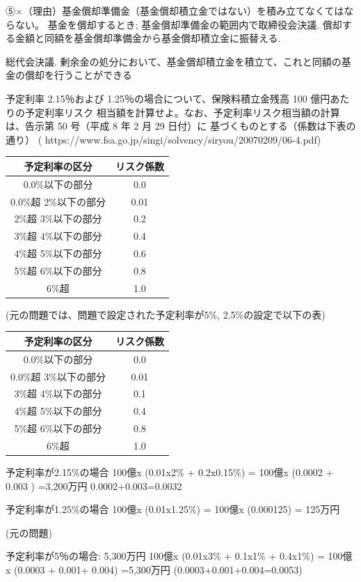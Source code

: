 \documentclass[report,gutter=10mm,fore-edge=10mm,uplatex,dvipdfmx]{jlreq}
\begin{document}
⑤×（理由）基金償却準備金（基金償却積立金ではない）を積み立てなくてはならない。
基金を償却するとき;   
  基金償却準備金の範囲内で取締役会決議.   
  償却する金額と同額を基金償却準備金から基金償却積立金に振替える.

  総代会決議. 剰余金の処分において、基金償却積立金を積立て、これと同額の基金の償却を行うことができる

予定利率 2.15％および 1.25％の場合について、保険料積立金残高 100 億円あたりの予定利率リスク
相当額を計算せよ。なお、予定利率リスク相当額の計算は、告示第 50 号（平成 8 年 2 月 29 日付）に
基づくものとする（係数は下表の通り）
( https://www.fsa.go.jp/singi/solvency/siryou/20070209/06-4.pdf)

\begin{tabular}{|c|c|}
\hline 予定利率の区分& リスク係数\\ \hline
 0.0\%以下の部分&0.0 \\
 0.0\%超 2\%以下の部分&0.01 \\
 2\%超 3\%以下の部分&0.2 \\
 3\%超 4\%以下の部分&0.4 \\
 4\%超 5\%以下の部分&0.6 \\
 5\%超 6\%以下の部分&0.8 \\
 6\%超 &1.0 \\
\hline
\end{tabular}

(元の問題では、問題で設定された予定利率が5\%, 2.5\%の設定で以下の表)

\begin{tabular}{|c|c|}
\hline 予定利率の区分& リスク係数\\ \hline
 0.0\%以下の部分&0.0 \\
 0.0\%超 3\%以下の部分&0.01 \\
 3\%超 4\%以下の部分&0.1 \\
 4\%超 5\%以下の部分&0.4 \\
 5\%超 6\%以下の部分&0.8 \\
 6\%超 &1.0 \\ \hline
\end{tabular}

\answer{}
予定利率が2.15\%の場合
100億x (0.01x2\% + 0.2x0.15\%) = 100億x (0.0002 + 0.003 ) =3,200万円
0.0002+0.003=0.0032

予定利率が1.25\%の場合
100億x (0.01x1.25\%) = 100億x (0.000125) = 125万円

(元の問題)

予定利率が5％の場合: 5,300万円
100億x (0.01x3\% + 0.1x1\% + 0.4x1\%) = 100億x (0.0003 + 0.001+ 0.004) =5,300万円
(0.0003+0.001+0.004=0.0053)
\end{document}
